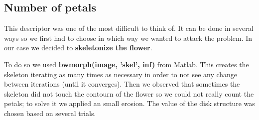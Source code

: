 \documentclass[11]{article}
\begin{document}
\subsection{Number of petals}

This descriptor was one of the most difficult to think of. It can be done in several ways so we first had to choose in which way we wanted to attack the problem. In our case we decided to \textbf{skeletonize the flower}.
\medskip

To do so we used \textbf{bwmorph(image, 'skel', inf)} from Matlab. This	 creates the skeleton iterating as many times as necessary in order to not see any change between iterations (until it converges). Then we observed that sometimes the skeleton did not touch the contourn of the flower so we could not really count the petals; to solve it we applied an small erosion. The value of the disk structure was chosen based on several trials. 
\medskip
\end{document}
